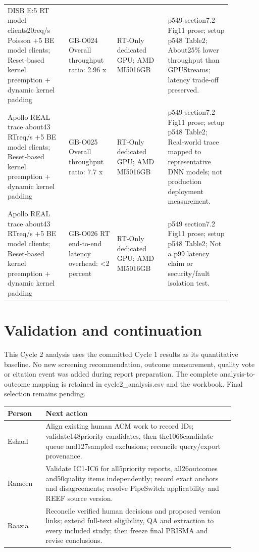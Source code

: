 \documentclass[12pt,a4paper]{article}
\begin{document}
\begin{longtable}{p{0.24\linewidth}p{0.19\linewidth}p{0.2\linewidth}p{0.25\linewidth}}
DISB E:5 RT model clients20req/\allowbreak{}s Poisson +5 BE model clients; Reset-based kernel preemption + dynamic kernel padding & GB-O024 Overall throughput ratio: 2.96 x & RT-Only dedicated GPU; AMD MI5016GB & p549 section7.2 Fig11 prose; setup p548 Table2; About25\% lower throughput than GPUStreams; latency trade-off preserved.\\
Apollo REAL trace about43 RTreq/\allowbreak{}s +5 BE model clients; Reset-based kernel preemption + dynamic kernel padding & GB-O025 Overall throughput ratio: 7.7 x & RT-Only dedicated GPU; AMD MI5016GB & p549 section7.2 Fig11 prose; setup p548 Table2; Real-world trace mapped to representative DNN models; not production deployment measurement.\\
Apollo REAL trace about43 RTreq/\allowbreak{}s +5 BE model clients; Reset-based kernel preemption + dynamic kernel padding & GB-O026 RT end-to-end latency overhead: <2 percent & RT-Only dedicated GPU; AMD MI5016GB & p549 section7.2 Fig11 prose; setup p548 Table2; Not a p99 latency claim or security/\allowbreak{}fault isolation test.\\
\bottomrule
\end{longtable}


\clearpage\section{Validation and continuation}
This Cycle 2 analysis uses the committed Cycle 1 results as its quantitative baseline. No new screening recommendation, outcome measurement, quality vote or citation event was added during report preparation. The complete analysis-to-outcome mapping is retained in cycle2\_analysis.csv and the workbook. Final selection remains pending.


\begin{longtable}{p{0.15\linewidth}p{0.74\linewidth}}
\toprule
Person & Next action\\\midrule
\endhead
Eshaal & Align existing human ACM work to record IDs; validate148priority candidates, then the1066candidate queue and127sampled exclusions; reconcile query/\allowbreak{}export provenance.\\
Rameen & Validate IC1-IC6 for all5priority reports, all26outcomes and50quality items independently; record exact anchors and disagreements; resolve PipeSwitch applicability and REEF source version.\\
Raazia & Reconcile verified human decisions and proposed version links; extend full-text eligibility, QA and extraction to every included study; then freeze final PRISMA and revise conclusions.\\
\bottomrule
\end{longtable}
\end{document}
